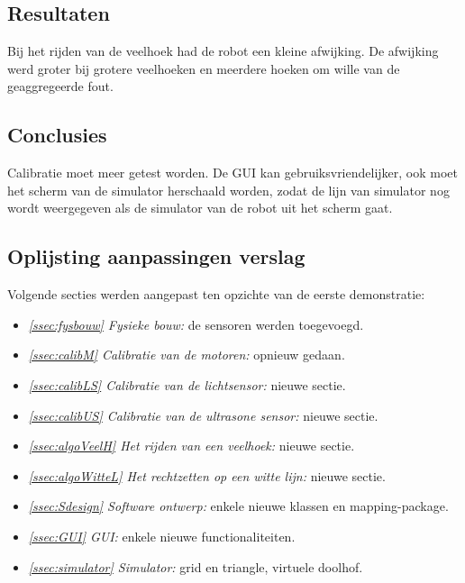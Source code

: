 \documentclass[tt3]{penoverslag}
\begin{document}
\subsection{Resultaten} %
\label{Assec:result1}
Bij het rijden van de veelhoek had de robot een kleine afwijking. De afwijking werd groter bij grotere veelhoeken en meerdere hoeken om wille van de geaggregeerde fout.

\subsection{Conclusies} %
\label{Assec:conc1}
Calibratie moet meer getest worden. De GUI kan gebruiksvriendelijker, ook moet het scherm van de simulator herschaald worden, zodat de lijn van simulator nog wordt weergegeven als de simulator van de robot uit het scherm gaat.

\subsection{Oplijsting aanpassingen verslag} %
\label{Assec:aanp1}
Volgende secties werden aangepast ten opzichte van de eerste demonstratie:

\begin{itemize}
\item \textit{\ref{ssec:fysbouw} Fysieke bouw:} de sensoren werden toegevoegd.
\item \textit{\ref{ssec:calibM} Calibratie van de motoren:} opnieuw gedaan.
\item \textit{\ref{ssec:calibLS} Calibratie van de lichtsensor:} nieuwe sectie.
\item \textit{\ref{ssec:calibUS} Calibratie van de ultrasone sensor:} nieuwe sectie.
\item \textit{\ref{ssec:algoVeelH} Het rijden van een veelhoek:} nieuwe sectie.
\item \textit{\ref{ssec:algoWitteL} Het rechtzetten op een witte lijn:} nieuwe sectie.
\item \textit{\ref{ssec:Sdesign} Software ontwerp:} enkele nieuwe klassen en mapping-package.
\item \textit{\ref{ssec:GUI} GUI:} enkele nieuwe functionaliteiten.
\item \textit{\ref{ssec:simulator} Simulator:} grid en triangle, virtuele doolhof.
\end{itemize}


\end{document}
